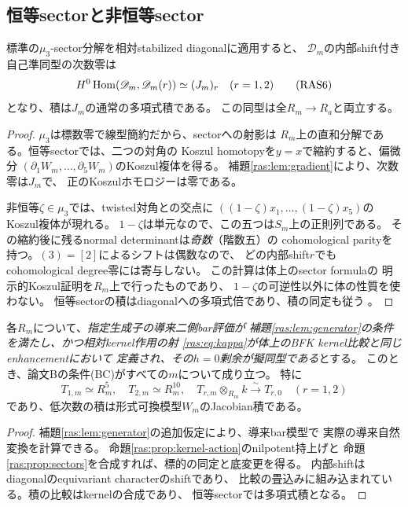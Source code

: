 \subsection{恒等sectorと非恒等sector}

\begin{proposition}[五変数の相対sector計算]\label{ras:prop:sectors}
標準の$\mu_3$-sector分解を相対stabilized diagonalに適用すると、
$\mathscr D_m$の内部shift付き自己準同型の次数零は
\[
 H^0\operatorname{Hom}(\mathscr D_m,\mathscr D_m(r))
 \simeq (J_m)_r\quad(r=1,2)
 \tag{RAS6}\label{ras:eq:sectors}
\]
となり、積は$J_m$の通常の多項式積である。
この同型は全$R_m\to R_a$と両立する。
\end{proposition}
\begin{proof}
$\mu_3$は標数零で線型簡約だから、sectorへの射影は
$R_m$上の直和分解である。恒等sectorでは、二つの対角の
Koszul homotopyを$y=x$で縮約すると、偏微分
$(\partial_1W_m,\ldots,\partial_5W_m)$のKoszul複体を得る。
補題\ref{ras:lem:gradient}により、次数零は$J_m$で、
正のKoszulホモロジーは零である。

非恒等$\zeta\in\mu_3$では、twisted対角との交点に
$((1-\zeta)x_1,\ldots,(1-\zeta)x_5)$のKoszul複体が現れる。
$1-\zeta$は単元なので、この五つは$S_m$上の正則列である。
その縮約後に残るnormal determinantは\emph{奇数}（階数五）の
cohomological parityを持つ。$(3)=[2]$によるシフトは偶数なので、
どの内部shift$r$でもcohomological degree零には寄与しない。
この計算は体上のsector formula\cite[Theorem~3.5]{RASLZ}の
明示的Koszul証明を$R_m$上で行ったものであり、
$1-\zeta$の可逆性以外に体の性質を使わない。
恒等sectorの積はdiagonalへの多項式倍であり、積の同定も従う
\cite[Remark~3.6]{RASLZ}。
\end{proof}

\begin{theorem}[相対kernel比較の下での(BC)]\label{ras:thm:bc}
各$R_m$について、\emph{指定生成子の導来二側bar評価が
補題\ref{ras:lem:generator}の条件を満たし、かつ相対kernel作用の射
\eqref{ras:eq:kappa}が体上のBFK kernel比較と同じenhancementにおいて
定義され、その$h=0$剰余が擬同型である}とする。
このとき、論文Bの条件(BC)がすべての$m$について成り立つ。
特に
\[
 T_{1,m}\simeq R_m^5,\quad T_{2,m}\simeq R_m^{10},\quad
 T_{r,m}\otimes_{R_m}k\xrightarrow{\sim}T_{r,0}\quad(r=1,2)
\]
であり、低次数の積は形式可換模型$W_m$のJacobian積である。
\end{theorem}
\begin{proof}
補題\ref{ras:lem:generator}の追加仮定により、導来bar模型で
実際の導来自然変換を計算できる。
命題\ref{ras:prop:kernel-action}のnilpotent持上げと
命題\ref{ras:prop:sectors}を合成すれば、標的の同定と底変更を得る。
内部shiftはdiagonalのequivariant characterのshiftであり、
比較の畳込みに組み込まれている。積の比較はkernelの合成であり、
恒等sectorでは多項式積となる。
\end{proof}

